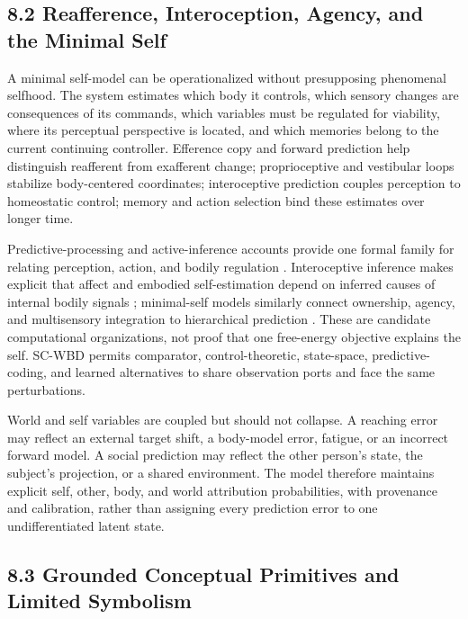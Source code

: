 \subsection{8.2 Reafference, Interoception, Agency, and the Minimal Self}

A minimal self-model can be operationalized without presupposing phenomenal
selfhood. The system estimates which body it controls, which sensory changes
are consequences of its commands, which variables must be regulated for
viability, where its perceptual perspective is located, and which memories
belong to the current continuing controller. Efference copy and forward
prediction help distinguish reafferent from exafferent change; proprioceptive
and vestibular loops stabilize body-centered coordinates; interoceptive
prediction couples perception to homeostatic control; memory and action
selection bind these estimates over longer time.

Predictive-processing and active-inference accounts provide one formal family
for relating perception, action, and bodily regulation
\citep{friston2010}. Interoceptive inference makes explicit that affect and
embodied self-estimation depend on inferred causes of internal bodily signals
\citep{seth2013}; minimal-self models similarly connect ownership, agency, and
multisensory integration to hierarchical prediction
\citep{limanowski2013}. These are candidate computational organizations, not
proof that one free-energy objective explains the self. SC-WBD permits
comparator, control-theoretic, state-space, predictive-coding, and learned
alternatives to share observation ports and face the same perturbations.

World and self variables are coupled but should not collapse. A reaching error
may reflect an external target shift, a body-model error, fatigue, or an
incorrect forward model. A social prediction may reflect the other person's
state, the subject's projection, or a shared environment. The model therefore
maintains explicit self, other, body, and world attribution probabilities,
with provenance and calibration, rather than assigning every prediction error
to one undifferentiated latent state.

\subsection{8.3 Grounded Conceptual Primitives and Limited Symbolism}


